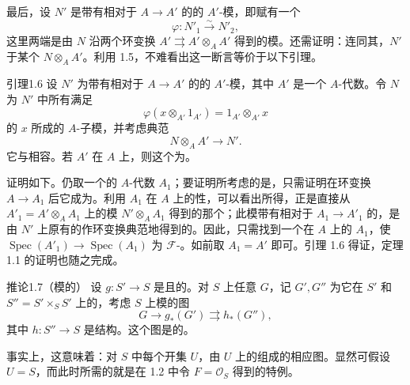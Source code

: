 最后，设 $N'$ 是带有相对于 $A\to A'$ 的的 $A'$-模，即赋有一个
\[
\varphi:N'_1\xrightarrow{\sim}N'_2,
\]
这里两端是由 $N$ 沿两个环变换 $A'\rightrightarrows A'\otimes_A A'$ 得到的模。还需证明：连同其，$N'$ 于某个 $N\otimes_A A'$。利用 1.5，不难看出这一断言等价于以下引理。

\begin{SGAresult}{引理}{1.6}
设 $N'$ 为带有相对于 $A\to A'$ 的的 $A'$-模，其中 $A'$ 是一个 $A$-代数。令 $N$ 为 $N'$ 中所有满足
\[
\varphi(x\otimes_{A'}1_{A'})=1_{A'}\otimes_{A'}x
\]
的 $x$ 所成的 $A$-子模，并考虑典范
\[
N\otimes_A A'\longrightarrow N'.
\]
它与相容。若 $A'$ 在 $A$ 上，则这个为。
\end{SGAresult}
证明如下。仍取一个的 $A$-代数 $A_1$；要证明所考虑的是，只需证明在环变换 $A\to A_1$ 后它成为。利用 $A_1$ 在 $A$ 上的性，可以看出所得，正是直接从 $A'_1=A'\otimes_A A_1$ 上的模 $N'\otimes_A A_1$ 得到的那个；此模带有相对于 $A_1\to A'_1$ 的，是由 $N'$ 上原有的作环变换典范地得到的。因此，只需找到一个在 $A$ 上的 $A_1$，使 $\operatorname{Spec}(A'_1)\to\operatorname{Spec}(A_1)$ 为 $\mathcal F$-。如前取 $A_1=A'$ 即可。引理 1.6 得证，定理 1.1 的证明也随之完成。

\begin{SGAresult}{推论}{1.7（模的）}
设 $g:S'\to S$ 是且的。对 $S$ 上任意 $G$，记 $G',G''$ 为它在 $S'$ 和 $S''=S'\times_S S'$ 上的，考虑 $S$ 上模的图
\[
G\longrightarrow g_*(G')\rightrightarrows h_*(G''),
\]
其中 $h:S''\to S$ 是结构。这个图是的。
\end{SGAresult}
事实上，这意味着：对 $S$ 中每个开集 $U$，由 $U$ 上的组成的相应图。显然可假设 $U=S$，而此时所需的就是在 1.2 中令 $F=\mathcal O_S$ 得到的特例。


